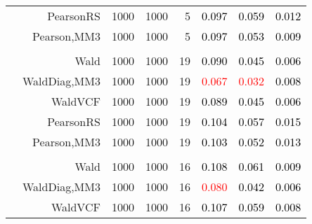 \documentclass[
]{article}
\begin{document}
\begin{table}[H]
{\begin{tabular}[t]{lrrrrrrr}
\hspace{1em} & PearsonRS & 1000 & 1000 & 5 & \textcolor{black}{0.097} & \textcolor{black}{0.059} & \textcolor{black}{0.012}\\

\hspace{1em} & Pearson,MM3 & 1000 & 1000 & 5 & \textcolor{black}{0.097} & \textcolor{black}{0.053} & \textcolor{black}{0.009}\\
\cmidrule{1-8}
\addlinespace[0.3em]
\multicolumn{8}{l}{\textbf{1F 15V}}\\
\hspace{1em} & Wald & 1000 & 1000 & 19 & \textcolor{black}{0.090} & \textcolor{black}{0.045} & \textcolor{black}{0.006}\\

\hspace{1em} & WaldDiag,MM3 & 1000 & 1000 & 19 & \textcolor{red}{0.067} & \textcolor{red}{0.032} & \textcolor{black}{0.008}\\

\hspace{1em} & WaldVCF & 1000 & 1000 & 19 & \textcolor{black}{0.089} & \textcolor{black}{0.045} & \textcolor{black}{0.006}\\

\hspace{1em} & PearsonRS & 1000 & 1000 & 19 & \textcolor{black}{0.104} & \textcolor{black}{0.057} & \textcolor{black}{0.015}\\

\hspace{1em} & Pearson,MM3 & 1000 & 1000 & 19 & \textcolor{black}{0.103} & \textcolor{black}{0.052} & \textcolor{black}{0.013}\\
\cmidrule{1-8}
\addlinespace[0.3em]
\multicolumn{8}{l}{\textbf{2F 10V}}\\
\hspace{1em} & Wald & 1000 & 1000 & 16 & \textcolor{black}{0.108} & \textcolor{black}{0.061} & \textcolor{black}{0.009}\\

\hspace{1em} & WaldDiag,MM3 & 1000 & 1000 & 16 & \textcolor{red}{0.080} & \textcolor{black}{0.042} & \textcolor{black}{0.006}\\

\hspace{1em} & WaldVCF & 1000 & 1000 & 16 & \textcolor{black}{0.107} & \textcolor{black}{0.059} & \textcolor{black}{0.008}\\


\end{tabular}}
\end{table}
\end{document}
